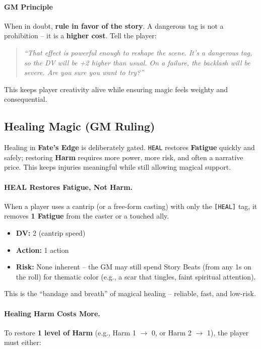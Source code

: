 \paragraph{GM Principle}
When in doubt, \textbf{rule in favor of the story}. A dangerous tag is not a prohibition -- it is a \textbf{higher cost}. Tell the player:

\begin{quote}
\emph{``That effect is powerful enough to reshape the scene. It's a dangerous tag, so the DV will be +2 higher than usual. On a failure, the backlash will be severe. Are you sure you want to try?''}
\end{quote}

This keeps player creativity alive while ensuring magic feels weighty and consequential.

\subsection*{Healing Magic (GM Ruling)}
\label{subsec:healing-magic-gm}

Healing in \textbf{Fate's Edge} is deliberately gated. \texttt{HEAL} restores \textbf{Fatigue} quickly and safely; restoring \textbf{Harm} requires more power, more risk, and often a narrative price. This keeps injuries meaningful while still allowing magical support.

\paragraph{HEAL Restores Fatigue, Not Harm.}
When a player uses a cantrip (or a free-form casting) with only the \texttt{[HEAL]} tag, it removes \textbf{1 Fatigue} from the caster or a touched ally.  
\begin{itemize}
  \item \textbf{DV:} 2 (cantrip speed)  
  \item \textbf{Action:} 1 action  
  \item \textbf{Risk:} None inherent -- the GM may still spend Story Beats (from any 1s on the roll) for thematic color (e.g., a scar that tingles, faint spiritual attention).
\end{itemize}
This is the ``bandage and breath'' of magical healing -- reliable, fast, and low-risk.

\paragraph{Healing Harm Costs More.}
To restore \textbf{1 level of Harm} (e.g., Harm 1 $\rightarrow$ 0, or Harm 2 $\rightarrow$ 1), the player must either:

